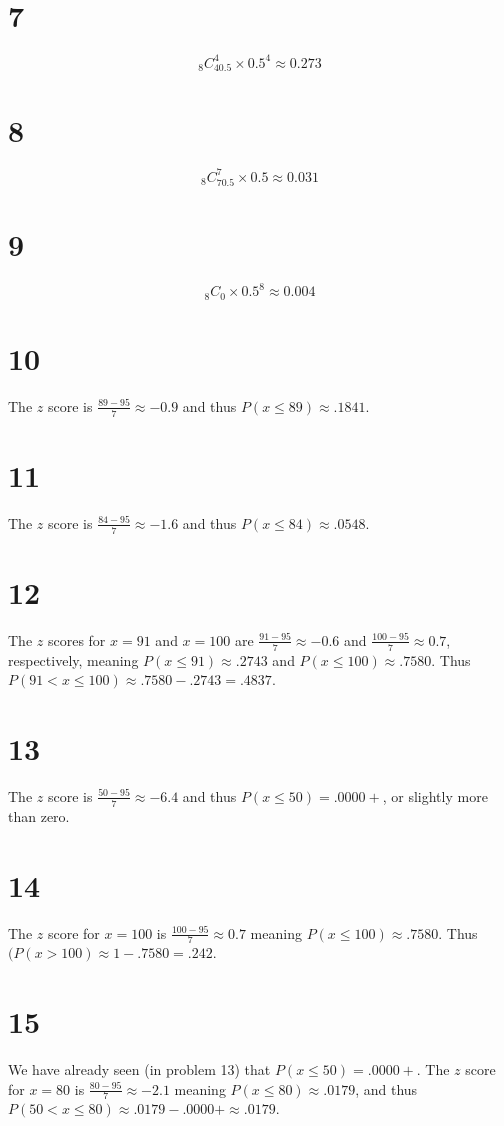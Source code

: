 \documentclass{article}
\theoremstyle{definition}
\newcommand{\?}{\stackrel{?}{=}}
\begin{document}
\section*{7}
\[ _8C_40.5^4\times 0.5^4\approx 0.273 \]

\section*{8}
\[ _8C_70.5^7\times 0.5\approx 0.031 \]

\section*{9}
\[ _8C_0\times 0.5^8\approx 0.004 \]

\section*{10}
The $z$ score is $\frac{89-95}{7}\approx -0.9$ and thus $P(x\le 89)\approx .1841$.

\section*{11}
The $z$ score is $\frac{84-95}{7}\approx -1.6$ and thus $P(x\le 84)\approx .0548$.

\section*{12}
The $z$ scores for $x=91$ and $x=100$ are $\frac{91-95}{7}\approx -0.6$ and $\frac{100-95}{7}\approx 0.7$, respectively, meaning $P(x\le 91)\approx .2743$ and $P(x\le 100)\approx .7580$. Thus 
$P(91<x\le 100)\approx .7580-.2743=.4837$.

\section*{13}
The $z$ score is $\frac{50-95}{7}\approx -6.4$ and thus $P(x\le 50)=.0000+$, or slightly more than zero.

\section*{14}
The $z$ score for $x=100$ is $\frac{100-95}{7}\approx 0.7$ meaning $P(x\le 100)\approx .7580$. Thus $(P(x>100)\approx 1-.7580=.242$.

\section*{15}
We have already seen (in problem 13) that $P(x\le 50)=.0000+$. The $z$ score for $x=80$ is $\frac{80-95}{7}\approx -2.1$ meaning $P(x\le 80)\approx .0179$, and thus 
$P(50<x\le 80)\approx .0179-.0000+\approx .0179$. 
\end{document}
